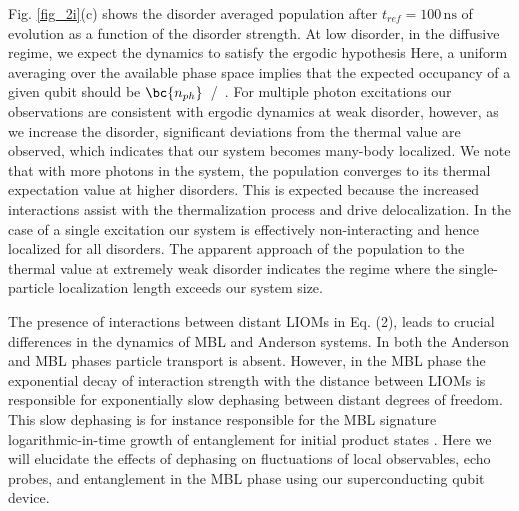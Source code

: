 Fig. \ref{fig_2i}(c) shows the disorder averaged population after $t_{ref}=100\, \text{ns}$ of evolution as a function of the disorder strength.
At low disorder, in the diffusive regime, we expect the dynamics to satisfy the ergodic hypothesis 
Here, a uniform averaging over the available phase space implies that the expected occupancy of a given qubit should be $\bc{n_{ph}}$~/~.
For multiple photon excitations our observations are consistent with ergodic dynamics at weak disorder, however, as we increase the disorder, significant deviations from the thermal value are observed, which indicates that our system becomes many-body localized.
We note that with more photons in the system, the population converges to its thermal expectation value at higher disorders.
This is expected because the increased interactions assist with the thermalization process and drive delocalization.
In the case of a single excitation our system is effectively non-interacting and hence localized for all disorders. The apparent approach of the population to the thermal value at extremely weak disorder indicates the regime where the single-particle localization length exceeds our system size.

The presence of interactions between distant LIOMs in Eq. (2), leads to crucial differences in the dynamics of MBL and Anderson systems.
In both the Anderson and MBL phases particle transport is absent.
However, in the MBL phase the exponential decay of interaction strength with the distance between LIOMs is responsible for exponentially slow dephasing between distant degrees of freedom.
This slow dephasing is for instance responsible for the MBL signature logarithmic-in-time growth of entanglement for initial product states \autocite{Bardarson2012, Huse2014, Serbyn2013}. Here we will elucidate the effects of dephasing on fluctuations of local observables, echo probes, and entanglement in the MBL phase using our superconducting qubit device.

